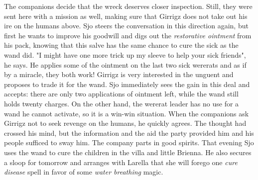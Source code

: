 The companions decide that the wreck deserves closer inspection. Still, they were sent here with a mission as well, making sure that Girrigz does not take out his ire on the humans above. Sjo steers the conversation in this direction again, but first he wants to improve his goodwill and digs out the {\itshape restorative ointment} from his pack, knowing that this salve has the same chance to cure the sick as the wand did. "I might have one more trick up my sleeve to help your sick friends", he says. He applies some of the ointment on the last two sick wererats and as if by a miracle, they both work! Girrigz is very interested in the unguent and proposes to trade it for the wand. Sjo immediately sees the gain in this deal and accepts: there are only two applications of ointment left, while the wand still holds twenty charges. On the other hand, the wererat leader has no use for a wand he cannot activate, so it is a win-win situation. When the companions ask Girrigz not to seek revenge on the humans, he quickly agrees. The thought had crossed his mind, but the information and the aid the party provided him and his people sufficed to sway him. The company parts in good spirits. That evening Sjo uses the wand to cure the children in the villa and little Brienna. He also secures a sloop for tomorrow and arranges with Larella that she will forego one {\itshape cure disease} spell in favor of some  {\itshape water breathing} magic. 